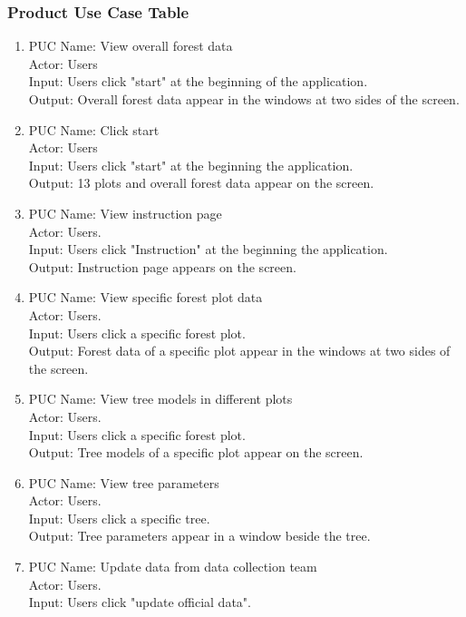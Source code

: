 \documentclass{article}
\begin{document}
\subsubsection{Product Use Case Table}
\begin{enumerate}
    \item PUC Name: View overall forest data\\
    Actor: Users\\
    Input: Users click "start" at the beginning of the application.\\
    Output: Overall forest data appear in the windows at two sides of the screen. 
    \item PUC Name: Click start\\
    Actor: Users\\
    Input: Users click "start" at the beginning the application.\\
    Output: 13 plots and overall forest data appear on the screen.
    \item PUC Name: View instruction page\\
    Actor: Users.\\
    Input: Users click "Instruction" at the beginning the application.\\
    Output: Instruction page appears on the screen. 
    \item PUC Name: View specific forest plot data\\
    Actor: Users.\\
    Input: Users click a specific forest plot.\\
    Output: Forest data of a specific plot appear in the windows at two sides of
    the screen. 
    \item PUC Name: View tree models in different plots\\
    Actor: Users.\\
    Input: Users click a specific forest plot.\\
    Output: Tree models of a specific plot appear on the screen.
    \item PUC Name: View tree parameters\\
    Actor: Users.\\
    Input: Users click a specific tree.\\
    Output: Tree parameters appear in a window beside the tree.
    \item PUC Name: Update data from data collection team\\
    Actor: Users.\\
    Input: Users click "update official data".\\

\end{enumerate}
\end{document}
